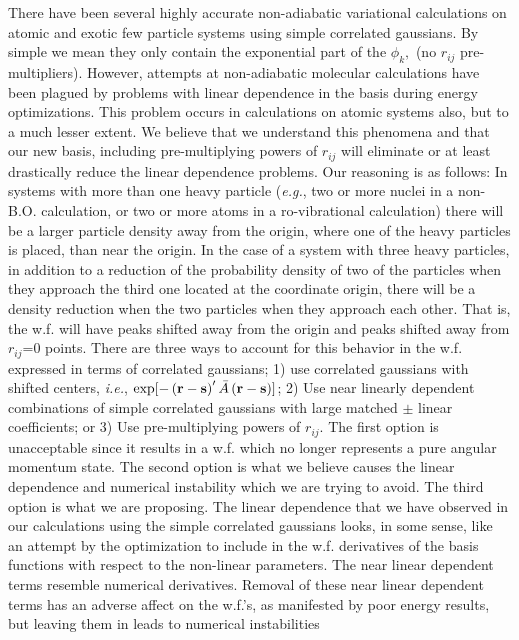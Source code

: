 There have been several highly accurate non-adiabatic variational
calculations on atomic and exotic few particle systems using simple
correlated gaussians\cite
{Kinghorn93,Kinghorn95b,A3,A37,Varga96}.
By simple we mean
they only contain the exponential part of the $\phi _k,$ (no $r_{ij}$
pre-multipliers). However, attempts at non-adiabatic molecular calculations
have been plagued by problems with linear dependence in the basis during
energy optimizations. This problem occurs in calculations on atomic systems
also, but to a much lesser extent. We believe that we understand this
phenomena and that our new basis, 
including pre-multiplying powers of $r_{ij}$
will eliminate or at least drastically reduce the linear dependence
problems. Our reasoning is as follows: In systems with more than one heavy
particle ({\it e.g.}, two or more nuclei in a non-B.O. calculation,
or two or more atoms in a ro-vibrational calculation)
there will be a larger particle density away from the origin,
where one of the heavy particles is placed, than near the origin.
In the case of a system with three heavy particles, in addition
to a reduction of the probability density of two of the particles
when they approach the third one located at the coordinate origin,
there will be a density reduction when the two particles when 
they approach
each other.
That is, the w.f. will have peaks shifted
away from the origin and peaks shifted away from 
$r_{ij}$=0 points. There are three ways to account for this behavior in
the w.f. expressed in terms of 
correlated gaussians; 1) use correlated gaussians
with shifted centers, {\it i.e.}, 
$\exp [-\left( {\bf r-s}\right) ^{\prime }%
\bar{A}\left( {\bf r-s}\right) ]$; 2) Use near linearly dependent
combinations of simple correlated gaussians with large matched $\pm $ linear
coefficients; or 3) Use pre-multiplying powers of $r_{ij}$. The first option
is unacceptable since it results in a w.f. which no longer
represents a pure angular momentum state. The second option is what we
believe causes the linear dependence and numerical instability which we are
trying to avoid. The third option is what we are proposing. The linear
dependence that we have observed in our calculations using the simple
correlated gaussians looks, in some sense, like an attempt by the
optimization to include in the w.f. derivatives of the basis
functions with respect to the non-linear parameters. The near linear
dependent terms resemble numerical derivatives. Removal of these near linear
dependent terms has an adverse affect on the w.f.'s, as manifested by
poor energy results, but leaving them in leads to numerical instabilities
